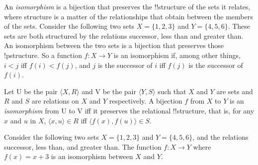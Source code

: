 \documentclass[../../include/open-logic-section]{subfiles}
\begin{document}

\begin{explain}
An \emph{isomorphism} is a bijection that preserves the !!{structure} of the sets it relates, where structure is a matter of the relationships that obtain between the members of the sets. Consider the following two sets $X=\{1,2,3\}$ and $Y=\{4,5,6\}$. These sets are both structured by the relations successor, less than and greater than. An isomorphism between the two sets is a bijection that preserves those !p{structure}. So a function $f : X \rightarrow Y$ is an isomorphism if, among other things, $i<j$ iff $f(i)<f(j)$, and $j$ is the successor of $i$ iff $f(j)$ is the successor of $f(i)$.
\end{explain}

\begin{defn}
Let U be the pair $\langle X,R\rangle$ and V be the pair $\langle Y,S\rangle$ such that $X$ and $Y$ are sets and $R$ and $S$ are relations on $X$ and $Y$ respectively. A bijection $f$ from $X$ to $Y$ is an \emph{isomorphism}  from U to V iff it preserves the relational !!{structure}, that is, for any $x$ and $u$ in $X$, $\langle x,u\rangle\in R$ iff $\langle f(x),f(u)\rangle\in S$.
\end{defn}

\begin{ex}
Consider the following two sets $X=\{1,2,3\}$ and $Y=\{4,5,6\}$, and the relations successor, less than, and greater than. The function $f: X \rightarrow Y$ where $f(x) = x+3$ is an isomorphism between $X$ and $Y$.
\end{ex}
\end{document}
